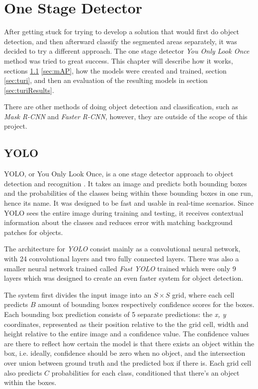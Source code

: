 \chapter{One Stage Detector}
After getting stuck for trying to develop a solution that would first do object detection, and then afterward classify the segmented areas separately, it was decided to try a different approach. The one stage detector  \textit{You Only Look Once} method was tried to great success. This chapter will describe how it works, sections \ref{sec:yolo} \ref{sec:mAP}, how the models were created and trained, section \ref{sec:turi}, and then an evaluation of the resulting models in section \ref{sec:turiResults}.

There are other methods of doing object detection and classification, such as \textit{Mask R-CNN} and \textit{Faster R-CNN}, however, they are outside of the scope of this project.
\section{YOLO}
\label{sec:yolo}
YOLO, or You Only Look Once, is a one stage detector approach to object detection and
 recognition \cite{YOLO1}. It takes an image and predicts both bounding boxes and the probabilities of the classes being within these bounding boxes in one run, hence its name. It was designed to be fast and usable in real-time scenarios. Since YOLO sees the entire image during training and testing, it receives contextual information about the classes and reduces error with matching background patches for objects. 
 
 The architecture for \textit{YOLO} consist mainly as a convolutional neural network, with 24 convolutional layers and two fully connected layers. There was also a smaller neural network trained called \textit{Fast YOLO} trained which were only 9 layers which was designed to create an even faster system for object detection. 
 
 The system first divides the input image into an  $S \times S$  grid, where each cell predicts $B$ amount of bounding boxes respectively confidence scores for the boxes. Each bounding box prediction consists of 5 separate predictions: the \textit{x, y} coordinates, represented as their position relative to the the grid cell, width and height relative to the entire image and a confidence value. The confidence values are there to reflect how certain the model is that there exists an object within the box, i.e. ideally, confidence should be zero when no object, and the intersection over union between ground truth and the predicted box if there is. Each grid cell also predicts $C$ probabilities for each class, conditioned that there's an object within the boxes. 
 
